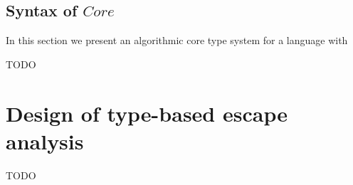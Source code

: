 \documentclass[acmsmall]{acmart}
\begin{document}



%





\subsection{Syntax of $Core$} \label{subsec:core-syntax}






In this section we present an algorithmic core type system for a language with

TODO %


\section{Design of type-based escape analysis} \label{sec:escape}

TODO %


%

\end{document}

